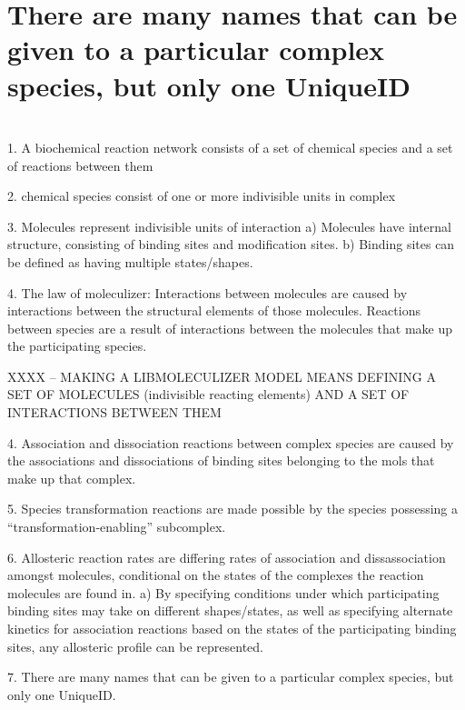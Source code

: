 \section{There are many names that can be given to a particular
  complex species, but only one UniqueID}  

\section{}
\section{}


1. A biochemical reaction network consists of a set of chemical
species and a set of reactions between them

2. chemical species consist of one or more indivisible units in complex

3. Molecules represent indivisible units of interaction
  a) Molecules have internal structure, consisting of binding sites
and modification sites.
  b) Binding sites can be defined as having multiple states/shapes.

4.  The law of moleculizer:  Interactions between molecules are caused
by interactions between the structural elements of those molecules.
Reactions between species are a result of interactions between the
molecules that make up the participating species.

XXXX -- MAKING A LIBMOLECULIZER MODEL MEANS DEFINING A SET OF
MOLECULES (indivisible reacting elements) AND A SET OF INTERACTIONS
BETWEEN THEM

4. Association and dissociation reactions between complex species are
caused by the associations and dissociations of binding sites
belonging to the mols that make up that complex.

5. Species transformation reactions are made possible by the species
possessing a ``transformation-enabling'' subcomplex.

6.  Allosteric reaction rates are differing rates of association and
dissassociation amongst molecules, conditional on the states of the
complexes the reaction molecules are found in.
a)  By specifying conditions under which participating binding sites
may take on different shapes/states, as well as specifying alternate
kinetics for association reactions based on the states of the
participating binding sites, any allosteric profile can be
represented.

7.  There are many names that can be given to a particular complex
species, but only one UniqueID.